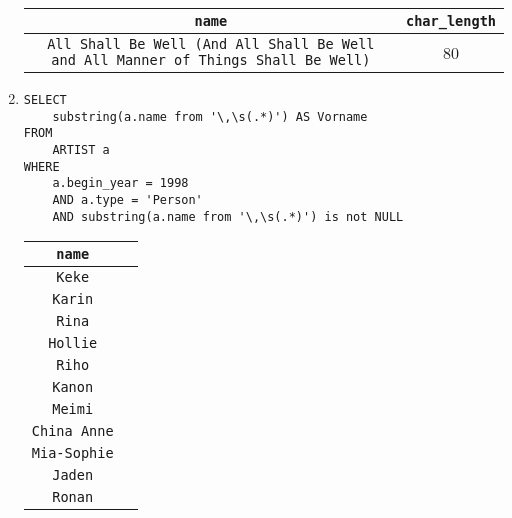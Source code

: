 \documentclass{article}
\begin{document}
\begin{enumerate}
            \begin{tabular}{|c|c|}
                \texttt{name} & \texttt{char\_length} \\
                \toprule
                \texttt{All Shall Be Well (And All Shall Be Well and All Manner of Things Shall Be Well)} & 80 \\
            \end{tabular}
        \item
            \begin{verbatim}
SELECT
    substring(a.name from '\,\s(.*)') AS Vorname
FROM
    ARTIST a
WHERE
    a.begin_year = 1998
    AND a.type = 'Person'
    AND substring(a.name from '\,\s(.*)') is not NULL
            \end{verbatim}
            \begin{tabular}{|c|c|}
                \texttt{name} \\
                \toprule
                \texttt{Keke} \\
                \texttt{Karin} \\
                \texttt{Rina} \\
                \texttt{Hollie} \\
                \texttt{Riho} \\
                \texttt{Kanon} \\
                \texttt{Meimi} \\
                \texttt{China Anne} \\
                \texttt{Mia-Sophie} \\
                \texttt{Jaden} \\
                \texttt{Ronan} \\
            \end{tabular}

    \end{enumerate}
\end{document}
